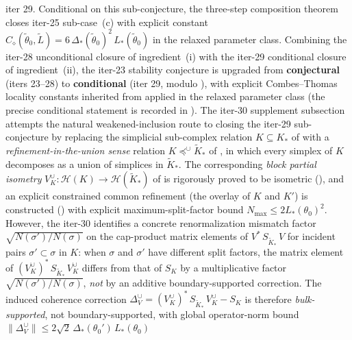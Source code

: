 \documentclass[11pt]{article}
\numberwithin{equation}{section}
\theoremstyle{definition}
\theoremstyle{remark}
\begin{document}
\begin{itemize}[leftmargin=2em]
iter 29. Conditional on this sub-conjecture, the three-step
composition theorem
 closes iter-25
sub-case~(c) with explicit constant
\(C_\diamond(\widetilde\theta_0,\widetilde L)
=6\,\Delta_*(\widetilde\theta_0)^2\,L_*(\widetilde\theta_0)\)
in the relaxed parameter class. Combining the iter-28
unconditional closure of ingredient~(i) with the iter-29
conditional closure of ingredient~(ii), the iter-23 stability
conjecture
 is upgraded
from \textbf{conjectural} (iters 23--28) to
\textbf{conditional} (iter 29, modulo
), with
explicit Combes--Thomas locality constants inherited from
 applied in the relaxed
parameter class (the precise conditional statement is recorded
in
). The iter-30
supplement subsection
 attempts the natural
weakened-inclusion route to closing the iter-29 sub-conjecture
by replacing the simplicial sub-complex relation
\(K\subseteq K_*\) of
 with a
\emph{refinement-in-the-union sense} relation
\(K\preceq^\cup\widetilde K_*\) of
, in which every simplex of
\(K\) decomposes as a union of simplices in
\(\widetilde K_*\). The corresponding \emph{block partial
isometry} \(V_K^\cup:\mathcal H(K)\to\mathcal H(\widetilde K_*)\)
of  is rigorously
proved to be isometric
(), and an explicit
constrained common refinement (the overlay of \(K\) and
\(K'\)) is constructed
() with explicit
maximum-split-factor bound
\(N_{\max}\le 2L_*(\theta_0)^2\). However, the iter-30
 identifies a
concrete renormalization mismatch factor
\(\sqrt{N(\sigma')/N(\sigma)}\) on the cap-product matrix
elements of \(V^*\,S_{\widetilde K_*}\,V\) for incident pairs
\(\sigma'\subset\sigma\) in \(K\): when \(\sigma\) and
\(\sigma'\) have different split factors, the matrix element of
\((V_K^\cup)^*\,S_{\widetilde K_*}\,V_K^\cup\) differs from that
of \(S_K\) by a multiplicative factor
\(\sqrt{N(\sigma')/N(\sigma)}\), \emph{not} by an additive
boundary-supported correction. The induced coherence
correction \(\Delta_V^\cup=(V_K^\cup)^*\,S_{\widetilde K_*}\,V_K^\cup-S_K\)
is therefore \emph{bulk-supported}, not boundary-supported, with
global operator-norm bound
\(\|\Delta_V^\cup\|\le 2\sqrt{2}\,\Delta_*(\theta_0')\,L_*(\theta_0)\)

\end{itemize}
\end{document}
